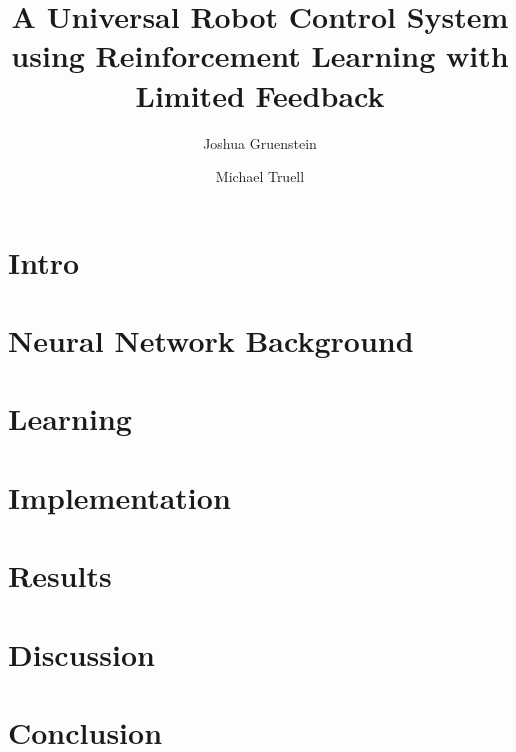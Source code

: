 \documentclass[letterpaper,11pt]{article}
\title{A Universal Robot Control System using Reinforcement Learning with Limited Feedback}
\author{Joshua Gruenstein \and Michael Truell}
\begin{document}
\maketitle



\pagebreak

\section{Intro}



\section{Neural Network Background}



\section{Learning}



\section{Implementation}



\section{Results}



\section{Discussion}



\section{Conclusion}



\nocite{gaskett,geoffrey,werbos,dini,macleod,dongsoo,dudek,watkins,rummery,baird}

\pagebreak


\end{document}
